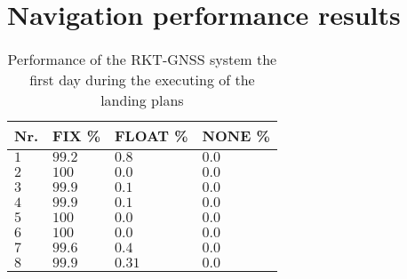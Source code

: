 \chapter{Navigation performance results}\label{AP:RTKPerformance}

\begin{table}
\centering
\begin{tabular}{| l | l | l | l |}
\hline
\textbf{Nr.}	& \textbf{FIX \%}	& \textbf{FLOAT \%}	& \textbf{NONE \%}	\\ \hline
$1$				& $99.2 $	& $0.8$	& $0.0$									\\ \hline
$2$				& $100 $	& $0.0$	& $0.0$									\\ \hline
$3$				& $99.9 $	& $0.1$	& $0.0$									\\ \hline
$4$				& $99.9$		& $0.1$	& $0.0$									\\ \hline
$5$				& $100$		& $0.0$	& $0.0$									\\ \hline
$6$				& $100$		& $0.0$	& $0.0$									\\ \hline
$7$				& $99.6$	& $0.4$	& $0.0$									\\ \hline
$8$				& $99.9 $ 	& $0.31$	& $0.0$									\\ \hline
\end{tabular}
\caption{Performance of the RKT-GNSS system the first day during the executing of the landing plans}
\label{TB:RTKFirstDayLanding}
\end{table}